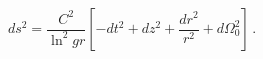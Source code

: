 \begin{equation}
ds^2 = \frac{C^2}{\ln^2 gr}[-dt^2 + dz^2 + \frac{dr^2}{r^2} + d\Omega_0^2]\,.
       \label{AdS5}
\end{equation}

